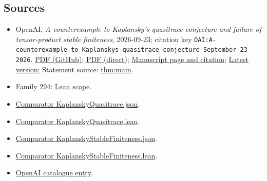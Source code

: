 \documentclass[11pt]{article}
\begin{document}
\subsection{Sources}
\begin{itemize}
\item OpenAI, \emph{A counterexample to Kaplansky's quasitrace conjecture and failure of tensor-product stable finiteness}, 2026-09-23; citation key \texttt{OAI:A-counterexample-to-Kaplanskys-quasitrace-conjecture-September-23-2026}. \href{https://github.com/openai/math/blob/adc7f1241b42e322a6451854ab7e4b4c146bf78a/preprints/A-counterexample-to-Kaplanskys-quasitrace-conjecture-September-23-2026/paper.pdf}{PDF (GitHub)}; \href{https://github.com/openai/math/raw/adc7f1241b42e322a6451854ab7e4b4c146bf78a/preprints/A-counterexample-to-Kaplanskys-quasitrace-conjecture-September-23-2026/paper.pdf}{PDF (direct)}; \href{https://github.com/openai/math/blob/adc7f1241b42e322a6451854ab7e4b4c146bf78a/preprints/A-counterexample-to-Kaplanskys-quasitrace-conjecture-September-23-2026/README.md}{Manuscript page and citation}; \href{https://github.com/openai/math/blob/main/preprints/A-counterexample-to-Kaplanskys-quasitrace-conjecture-September-23-2026/paper.pdf}{Latest version}; Statement source: \href{https://github.com/openai/math/blob/adc7f1241b42e322a6451854ab7e4b4c146bf78a/preprints/A-counterexample-to-Kaplanskys-quasitrace-conjecture-September-23-2026/build/01-introduction.tex\#L80}{thm:main}.
\item Family 294: \href{https://github.com/openai/math/blob/adc7f1241b42e322a6451854ab7e4b4c146bf78a/lean/docs/294.md}{Lean scope}.
\item \href{https://github.com/openai/math/blob/adc7f1241b42e322a6451854ab7e4b4c146bf78a/lean/ComparatorChallenges/KaplanskyQuasitrace.json}{Comparator KaplanskyQuasitrace.json}.
\item \href{https://github.com/openai/math/blob/adc7f1241b42e322a6451854ab7e4b4c146bf78a/lean/ComparatorChallenges/KaplanskyQuasitrace.lean}{Comparator KaplanskyQuasitrace.lean}.
\item \href{https://github.com/openai/math/blob/adc7f1241b42e322a6451854ab7e4b4c146bf78a/lean/ComparatorChallenges/KaplanskyStableFiniteness.json}{Comparator KaplanskyStableFiniteness.json}.
\item \href{https://github.com/openai/math/blob/adc7f1241b42e322a6451854ab7e4b4c146bf78a/lean/ComparatorChallenges/KaplanskyStableFiniteness.lean}{Comparator KaplanskyStableFiniteness.lean}.
\item \href{https://github.com/openai/math/blob/adc7f1241b42e322a6451854ab7e4b4c146bf78a/CONTENTS.md}{OpenAI catalogue entry}.
\end{itemize}
\end{document}

